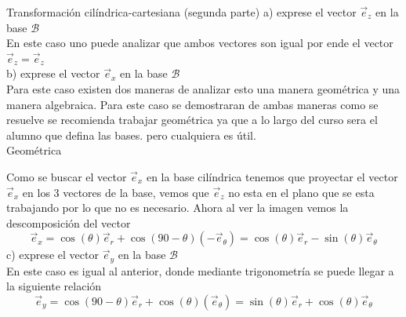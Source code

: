 \begin{solucion}{Transformación cilíndrica-cartesiana (segunda parte)}
\noindent a) exprese el vector $\vec{e}_z$ en la base $\mathcal{B}$\\
En este caso uno puede analizar que ambos vectores son igual por ende el vector $\vec{e}_z=\vec{e}_z$\\
b) exprese el vector $\vec{e}_x$ en la base $\mathcal{B}$\\
Para este caso existen dos maneras de analizar esto una manera geométrica y una manera algebraica. Para este caso se demostraran de ambas maneras como se resuelve se recomienda trabajar geométrica ya que a lo largo del curso sera el alumno que defina las bases. pero cualquiera es útil.\\ 
Geométrica
%
\begin{center}
    

\end{center}



Como se buscar el vector $\vec{e}_x$ en la base cilíndrica tenemos que proyectar el vector $\vec{e}_x$ en los 3 vectores de la base, vemos que $\vec{e}_z$ no esta en el plano que se esta trabajando por lo que no es necesario. Ahora al ver la imagen vemos la descomposición del vector
$$\vec{e}_x=\cos(\theta)\vec{e}_r+\cos(90-\theta)(-\vec{e}_{\theta})=\cos(\theta)\vec{e}_r-\sin(\theta)\vec{e}_{\theta}$$
c) exprese el vector $\vec{e}_y$ en la base $\mathcal{B}$ \\
En este caso es igual al anterior, donde mediante trigonometría se puede llegar a la siguiente relación\\
$$\vec{e}_y=\cos(90-\theta)\vec{e}_r+\cos(\theta)(\vec{e}_{\theta})=\sin(\theta)\vec{e}_r+\cos(\theta)\vec{e}_{\theta}$$


\end{solucion}
